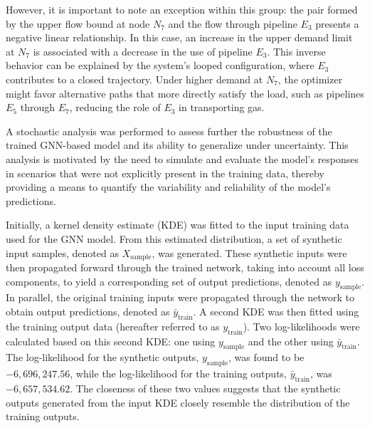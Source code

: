 However, it is important to note an exception within this group: the pair formed by the upper flow bound at node $N_7$ and the flow through pipeline $E_3$ presents a negative linear relationship. In this case, an increase in the upper demand limit at $N_7$ is associated with a decrease in the use of pipeline $E_3$. This inverse behavior can be explained by the system's looped configuration, where $E_3$ contributes to a closed trajectory. Under higher demand at $N_7$, the optimizer might favor alternative paths that more directly satisfy the load, such as pipelines $E_5$ through $E_7$, reducing the role of $E_3$ in transporting gas.








A stochastic analysis was performed to assess further the robustness of the trained GNN-based model and its ability to generalize under uncertainty. This analysis is motivated by the need to simulate and evaluate the model's responses in scenarios that were not explicitly present in the training data, thereby providing a means to quantify the variability and reliability of the model's predictions.

Initially, a kernel density estimate (KDE) was fitted to the input training data used for the GNN model. From this estimated distribution, a set of synthetic input samples, denoted as \( X_{\text{sample}} \), was generated. These synthetic inputs were then propagated forward through the trained network, taking into account all loss components, to yield a corresponding set of output predictions, denoted as \( y_{\text{sample}} \). In parallel, the original training inputs were propagated through the network to obtain output predictions, denoted as \(\bar{y}_{\text{train}}\). A second KDE was then fitted using the training output data (hereafter referred to as \(y_{\text{train}}\)). Two log-likelihoods were calculated based on this second KDE: one using \(y_{\text{sample}}\) and the other using \(\bar{y}_{\text{train}}\). The log-likelihood for the synthetic outputs, \(y_{\text{sample}}\), was found to be \(-6,696,247.56\), while the log-likelihood for the training outputs, \(\bar{y}_{\text{train}}\), was \(-6,657,534.62\). The closeness of these two values suggests that the synthetic outputs generated from the input KDE closely resemble the distribution of the training outputs.

